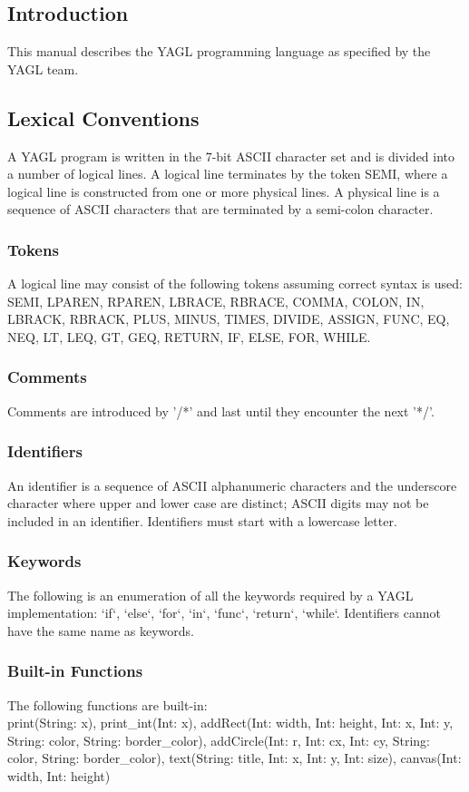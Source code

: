 \documentclass[12pt]{article}
\begin{document}
\subsection{Introduction}
This manual describes the YAGL programming language as specified by the YAGL team. 

\subsection{Lexical Conventions}
A YAGL program is written in the 7-bit ASCII character set and is divided into a number of logical lines. A logical line terminates by the token SEMI, where a logical line is constructed from one or more physical lines. A physical line is a sequence of ASCII characters that are terminated by a semi-colon character.

\subsubsection{Tokens}
A logical line may consist of the following tokens assuming correct syntax is used: \\
SEMI, LPAREN, RPAREN, LBRACE, RBRACE, COMMA, COLON, IN, LBRACK, RBRACK, PLUS, MINUS, TIMES, DIVIDE, ASSIGN, FUNC, EQ, NEQ, LT, LEQ, GT, GEQ, RETURN, IF, ELSE, FOR, WHILE. 

\subsubsection{Comments} 
Comments are introduced by '/*' and last until they encounter the next '*/'.

\subsubsection{Identifiers}
An identifier is a sequence of ASCII alphanumeric characters and the underscore character where upper and lower case are distinct; ASCII digits may not be included in an identifier.  Identifiers must start with a lowercase letter.

\subsubsection{Keywords}
The following is an enumeration of all the keywords required by a YAGL implementation:
`if`, `else`, `for`, `in`, `func`, `return`, `while`.  Identifiers cannot have the same name as keywords.

\subsubsection{Built-in Functions}
The following functions are built-in:\\
print(String: x), print\_int(Int: x), addRect(Int: width, Int: height, Int: x, Int: y, String: color, String: border\_color), addCircle(Int: r, Int: cx, Int: cy, String: color, String: border\_color), text(String: title, Int: x, Int: y, Int: size), canvas(Int: width, Int: height)
\end{document}
